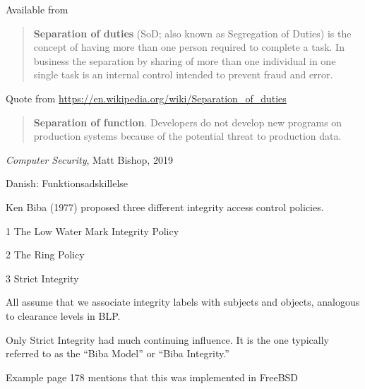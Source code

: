 \documentclass[Screen16to9,17pt]{foils}
\begin{document}
Available from\\ {\footnotesize{}}



\begin{quote}
{\bf Separation of duties} (SoD; also known as Segregation of Duties) is the concept of having more than one person required to complete a task. In business the separation by sharing of more than one individual in one single task is an internal control intended to prevent fraud and error.
\end{quote}

Quote from \url{https://en.wikipedia.org/wiki/Separation_of_duties}

\begin{quote}
{\bf Separation of function}. Developers do not develop new programs on production systems because of the potential threat to production data.
\end{quote}
\emph{Computer Security}, Matt Bishop, 2019

Danish: Funktionsadskillelse



Ken Biba (1977) proposed three different integrity access control
policies.

\begin{list2}
\item[1] The Low Water Mark Integrity Policy
\item[2] The Ring Policy
\item[3] Strict Integrity
\item All assume that we associate integrity labels with subjects and
objects, analogous to clearance levels in BLP.
\item Only Strict Integrity had much continuing influence. It is the one
typically referred to as the “Biba Model” or “Biba Integrity.”
\end{list2}


Example page 178 mentions that this was implemented in FreeBSD


\end{document}
